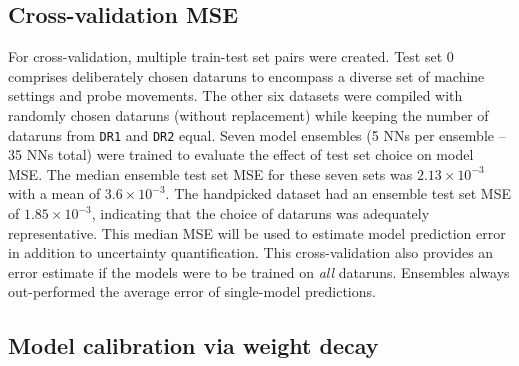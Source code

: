 \subsection{Cross-validation MSE}

For cross-validation, multiple train-test set pairs were created. Test set 0 comprises deliberately chosen dataruns to encompass a diverse set of machine settings and probe movements. The other six datasets were  compiled with randomly chosen dataruns (without replacement) while keeping the number of dataruns from \texttt{DR1} and \texttt{DR2} equal. Seven model ensembles (5 NNs per ensemble -- 35 NNs total) were trained to evaluate the effect of test set choice on model MSE. The median ensemble test set MSE for these seven sets was $2.13 \times 10^{-3}$ with a mean of $3.6 \times 10^{-3}$. The handpicked dataset had an ensemble test set MSE of $1.85 \times 10^{-3}$, indicating that the choice of dataruns was adequately representative. This median MSE will be used to estimate model prediction error in addition to uncertainty quantification. This cross-validation also provides an error estimate if the models were to be trained on \emph{all} dataruns. Ensembles always out-performed the average error of single-model predictions.



\subsection{Model calibration via weight decay}

